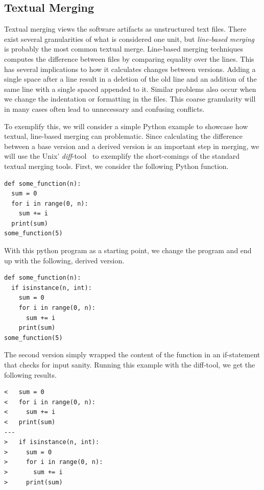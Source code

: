 \documentclass[a4paper,english]{ifimaster}
\begin{document}
\subsection{Textual Merging}%
\label{sub:textual_merging}

Textual merging views the software artifacts as unstructured text files. There exist several granularities of what is considered one unit, but \textit{line-based merging} is probably the most common textual merge. Line-based merging techniques computes the difference between files by comparing equality over the lines. This has several implications to how it calculates changes between versions. Adding a single space after a line result in a deletion of the old line and an addition of the same line with a single spaced appended to it. Similar problems also occur when we change the indentation or formatting in the files. This coarse granularity will in many cases often lead to unnecessary and confusing conflicts.

To exemplify this, we will consider a simple Python example to showcase how textual, line-based merging can problematic. Since calculating the difference between a base version and a derived version is an important step in merging, we will use the Unix' \textit{diff}-tool~\cite{cite:fast_algo_for_lcs} to exemplify the short-comings of the standard textual merging tools. First, we consider the following Python function.

\begin{verbatim}
def some_function(n):
  sum = 0
  for i in range(0, n):
    sum += i
  print(sum)
some_function(5)
\end{verbatim}

With this python program as a starting point, we change the program and end up with the following, derived version.

\begin{verbatim}
def some_function(n):
  if isinstance(n, int):
    sum = 0
    for i in range(0, n):
      sum += i
    print(sum)
some_function(5)
\end{verbatim}

The second version simply wrapped the content of the function in an if-statement that checks for input sanity. Running this example with the diff-tool, we get the following results.

\begin{verbatim}
<   sum = 0
<   for i in range(0, n):
<     sum += i
<   print(sum)
---
>   if isinstance(n, int):
>     sum = 0
>     for i in range(0, n):
>       sum += i
>     print(sum)
\end{verbatim}
\end{document}
